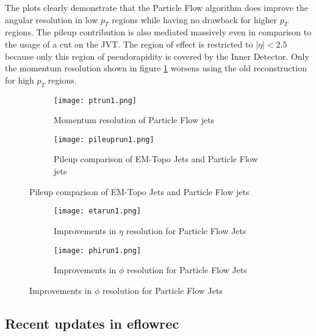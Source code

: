 The plots clearly demonstrate that the Particle Flow algorithm does improve the angular resolution in low $p_T$ regions while having no drawback for higher $p_T$ regions. The pileup contribution is also mediated massively even in comparison to the usage of a cut on the JVT. The region of effect is restricted to $|\eta|<\num{2.5}$ because only this region of pseudorapidity is covered by the Inner Detector. Only the momentum resolution shown in figure \ref{fig:ptrun1} worsens using the old reconstruction for high $p_T$ regions.


\begin{figure}[h]
  \centering
  \begin{subfigure}[b]{0.5\figwidth}
\texttt{[image: ptrun1.png]}
\caption[Momentum resolution of Particle Flow]{Momentum resolution of Particle Flow jets \cite{pflow16}}
\label{fig:ptrun1}
\end{subfigure}
\quad
  \begin{subfigure}[b]{0.5\figwidth}
  \texttt{[image: pileuprun1.png]}
  \caption[Pileup comparison of EM-Topo Jets and Particle Flow jets]{Pileup comparison of EM-Topo Jets and Particle Flow jets \cite{pflow16}}
  \label{fig:pileuprun1}
  \end{subfigure}
\end{figure}



\begin{figure}[h]
  \centering
  \begin{subfigure}[b]{0.5\figwidth}
  \texttt{[image: etarun1.png]}
  \caption[Improvements in $\eta$ resolution for Particle Flow Jets]{Improvements in $\eta$ resolution for Particle Flow Jets \cite{pflow16}}
  \label{fig:etarun1}
  \end{subfigure}
  \quad
  \begin{subfigure}[b]{0.5\figwidth}
  \texttt{[image: phirun1.png]}
  \caption[Improvements in $\phi$ resolution for Particle Flow Jets]{Improvements in $\phi$ resolution for Particle Flow Jets \cite{pflow16}}
  \label{fig:phirun1}
  \end{subfigure}
\end{figure}





\subsection{Recent updates in eflowrec}

